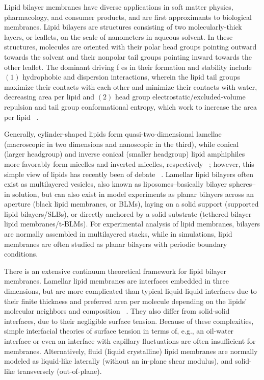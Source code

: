\documentclass[9pt,bestpractices,pubversion]{livecoms}
\begin{document}
Lipid bilayer membranes have diverse applications in soft matter physics, pharmacology, and consumer products, and are first approximants to biological membranes.
Lipid bilayers are structures consisting of two molecularly-thick layers, or leaflets, on the scale of nanometers in aqueous solvent.
In these structures, molecules are oriented with their polar head groups pointing outward towards the solvent and their nonpolar tail groups pointing inward towards the other leaflet.
The dominant driving f
es in their formation and stability include $(1)$ hydrophobic and dispersion interactions, wherein the lipid tail groups maximize their contacts with each other and minimize their contacts with water, decreasing area per lipid and $(2)$ head group electrostatic/excluded-volume repulsion and tail group conformational entropy, which work to increase the area per lipid ~\cite{Ben-Shaul1995}.

Generally, cylinder-shaped lipids form quasi-two-dimensional lamellae (macroscopic in two dimensions and nanoscopic in the third), while conical (larger headgroup) and inverse conical (smaller headgroup) lipid amphiphiles more favorably form micelles and inverted micelles, respectively ~\cite{Israelachvili2011}; however, this simple view of lipids has recently been of debate ~\cite{Sodt2016}.
Lamellar lipid bilayers often exist as multilayered vesicles, also known as liposomes--basically bilayer spheres--in solution, but can also exist in model experiments as planar bilayers across an aperture (black lipid membranes, or BLMs), laying on a solid support (supported lipid bilayers/SLBs), or directly anchored by a solid substrate (tethered bilayer lipid membranes/t-BLMs).
For experimental analysis of lipid membranes, bilayers are normally assembled in multilayered stacks, while in simulations, lipid membranes are often studied as planar bilayers with periodic boundary conditions.

There is an extensive continuum theoretical framework for lipid bilayer membranes.
Lamellar lipid membranes are interfaces embedded in three dimensions, but are more complicated than typical liquid-liquid interfaces due to their finite thickness and preferred area per molecule depending on the lipids' molecular neighbors and composition ~\cite{Diamant2011,Safran1994}.
They also differ from solid-solid interfaces, due to their negligible surface tension.
Because of these complexities, simple interfacial theories of surface tension in terms of, e.g., an oil-water interface or even an interface with capillary fluctuations are often insufficient for membranes.
Alternatively, fluid (liquid crystalline) lipid membranes are normally modeled as liquid-like laterally (without an in-plane shear modulus), and solid-like transversely (out-of-plane).
\end{document}
